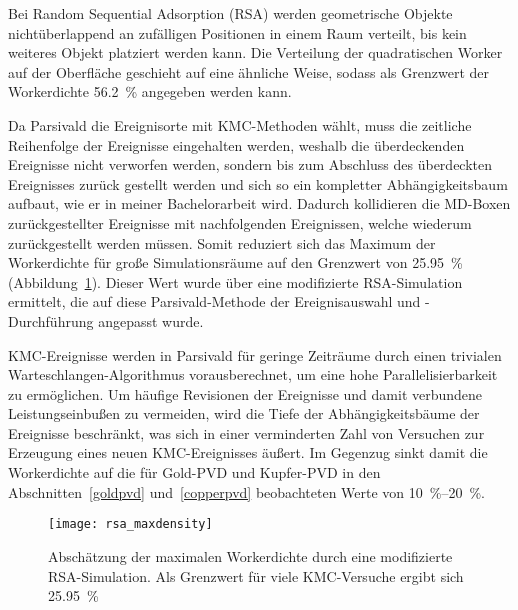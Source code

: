 Bei Random Sequential Adsorption (RSA) werden geometrische Objekte nichtüberlappend an zufälligen Positionen in einem Raum verteilt, bis kein weiteres Objekt platziert werden kann.
Die Verteilung der quadratischen Worker auf der Oberfläche geschieht auf eine ähnliche Weise, sodass als Grenzwert der Workerdichte \SI{56.2}{\percent}\cite{brosilow_random_1991} angegeben werden kann.

Da Parsivald die Ereignisorte mit KMC-Methoden wählt, muss die zeitliche Reihenfolge der Ereignisse eingehalten werden, weshalb die überdeckenden Ereignisse nicht verworfen werden, sondern bis zum Abschluss des überdeckten Ereignisses zurück gestellt werden und sich so ein kompletter Abhängigkeitsbaum aufbaut, wie er in meiner Bachelorarbeit wird\cite{lorenz_entwicklung_2012}.
Dadurch kollidieren die MD-Boxen zurückgestellter Ereignisse mit nachfolgenden Ereignissen, welche wiederum zurückgestellt werden müssen.
Somit reduziert sich das Maximum der Workerdichte für große Simulationsräume auf den Grenzwert von \SI{25.95}{\percent} (Abbildung~\ref{fig:rsamaxdensity}).
Dieser Wert wurde über eine modifizierte RSA-Simulation ermittelt, die auf diese Parsivald-Methode der Ereignisauswahl und -Durchführung angepasst wurde.

KMC-Ereignisse werden in Parsivald für geringe Zeiträume durch einen trivialen Warte\-schlangen-Algorithmus vorausberechnet, um eine hohe Parallelisierbarkeit zu ermöglichen.
Um häufige Revisionen der Ereignisse und damit verbundene Leistungseinbußen zu vermeiden, wird die Tiefe der Abhängigkeitsbäume der Ereignisse beschränkt, was sich in einer verminderten Zahl von Versuchen zur Erzeugung eines neuen KMC-Ereignisses äußert.
Im Gegenzug sinkt damit die Workerdichte auf die für Gold-PVD und Kupfer-PVD in den Abschnitten~\ref{goldpvd} und~\ref{copperpvd} beobachteten Werte von \SIrange{10}{20}{\percent}.

\vspace{2em}

\begin{figure}[h]
  \centering
  \texttt{[image: rsa\_maxdensity]}

  \caption[Abschätzung der maximalen Workerdichte per RSA-Simulation]{
    Abschätzung der maximalen Workerdichte durch eine modifizierte RSA-Simulation.
    Als Grenzwert für viele KMC-Versuche ergibt sich \SI{25.95}{\percent}
  }
  \label{fig:rsamaxdensity}

\end{figure}
